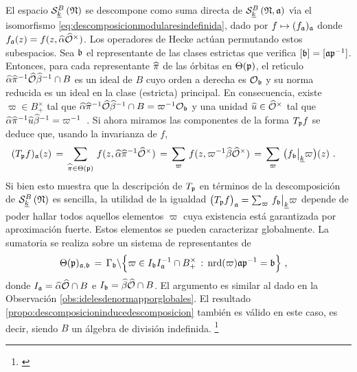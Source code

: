 El espacio $\spitzH[B]{k}{\frak{N}}$ se descompone como suma directa de
$\spitzH[B]{k}{\frak{N},\frak{a}}$ v\'{\i}a el isomorfismo
\eqref{eq:descomposicionmodularesindefinida}, dado por
$f\mapsto(f_{\frak{a}})_{\frak{a}}$ donde
$f_{\frak{a}}(z)=f(z,\hhat{\alpha}\Idfin{\cal{O}})$. Los operadores de Hecke
act\'{u}an permutando estos subespacios. Sea $\frak{b}$ el representante de las
clases estrictas que verifica $[\frak{b}]=[\frak{a}\frak{p}^{-1}]$. Entonces,
para cada representante $\hhat{\pi}$ de las \'{o}rbitas en $\Theta(\frak{p})$,
el ret\'{\i}culo
\begin{math}
	\hhat{\alpha}\hhat{\pi}^{-1}\Adfin{\cal{O}}\hhat{\beta}^{-1}\cap B
\end{math}
es un ideal de $B$ cuyo orden a derecha es $\cal{O}_{\frak{b}}$ y su norma
reducida es un ideal en la clase (estricta) principal. En consecuencia,
existe $\varpi\in B_{+}^{\times}$ tal que
\begin{math}
	\hhat{\alpha}\hhat{\pi}^{-1}\Adfin{\cal{O}}\hhat{\beta}^{-1}\cap B=
		\varpi^{-1}\cal{O}_{\frak{b}}
\end{math}
y una unidad $\hhat{u}\in\Idfin{\cal{O}}$ tal que
\begin{math}
	\hhat{\alpha}\hhat{\pi}^{-1}\hhat{u}\hhat{\beta}^{-1}=\varpi^{-1}
\end{math}~.
Si ahora miramos las componentes de la forma $T_{\frak{p}}f$ se deduce que,
usando la invarianza de $f$,
\begin{align*}
	(T_{\frak{p}}f)_{\frak{a}}(z) & \,=\,
		\sum_{\hhat{\pi}\in\Theta(\frak{p})}\,
			f(z,\hhat{\alpha}\hhat{\pi}^{-1}\Idfin{\cal{O}})
		\,=\, \sum_{\varpi}\,
			f(z,\varpi^{-1}\hhat{\beta}\Idfin{\cal{O}})
		\,=\, \sum_{\varpi}\,\big(
			f_{\frak{b}}\operadormatrices{\peso{k}}{\varpi}\big)(z)
	\text{ .}
\end{align*}
%
Si bien esto muestra que la descripci\'{o}n de $T_{\frak{p}}$ en t\'{e}rminos
de la descomposici\'{o}n de $\spitzH[B]{k}{\frak{N}}$ es sencilla, la utilidad
de la igualdad
\begin{math}
	\big(T_{\frak{p}}f\big)_{\frak{a}}=
		\sum_{\varpi}\,f_{\frak{b}}\operadormatrices{\peso{k}}{\varpi}
\end{math}
depende de poder hallar todos aquellos elementos $\varpi$ cuya existencia
est\'{a} garantizada por aproximaci\'{o}n fuerte. Estos elementos se pueden
caracterizar globalmente. La sumatoria se realiza sobre un sistema de
representantes de
\begin{align*}
	\Theta(\frak{p})_{\frak{a},\frak{b}} & \,=\,
		\Gamma_{\frak{b}}\backslash\Big\{\varpi\in
			I_{\frak{b}}I_{\frak{a}}^{-1}\cap B_{+}^{\times}\,:\,
			\nrd(\varpi)\frak{a}\frak{p}^{-1}=\frak{b}
		\Big\}
	\text{ ,}
\end{align*}
%
donde $I_{\frak{a}}=\hhat{\alpha}\Adfin{\cal{O}}\cap B$ e
$I_{\frak{b}}=\hhat{\beta}\Adfin{\cal{O}}\cap B$. El argumento es similar al
dado en la Observaci\'{o}n \ref{obs:idelesdenormapporglobales}. El resultado
\ref{propo:descomposicioninducedescomposicion} tambi\'{e}n es v\'{a}lido en
este caso, es decir, siendo $B$ un \'{a}lgebra de divisi\'{o}n indefinida.%
\footnote{
	\cite[Propo.~2.3]{ShimuraDirichletSeriesAbelianVarieties}
}

